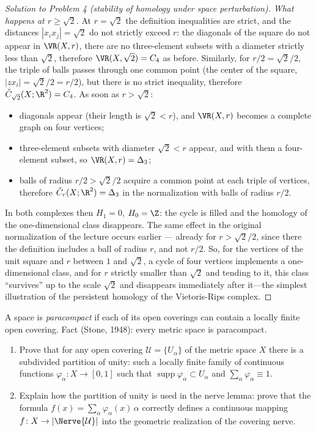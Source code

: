 \documentclass[a4paper,12pt]{report}
\begin{document}
\begin{proof}[Solution to Problem \textup{4} \textup{(}stability of homology under space perturbation\textup{)}]
\emph{What happens at $r\ge\sqrt2$.} At $r=\sqrt2$ the definition inequalities are strict, and the distances $|x_ix_j|=\sqrt2$ do not strictly exceed $r$: the diagonals of the square do not appear in $\VR(X,r)$, there are no three-element subsets with a diameter strictly less than $\sqrt2$, therefore $\VR(X,\sqrt2)=C_4$ as before. Similarly, for $r/2=\sqrt2/2$, the triple of balls passes through one common point \textup{(}the center of the square, $|zx_i|=\sqrt2/2=r/2$\textup{)}, but there is no strict inequality, therefore $\check C_{\sqrt2}(X;\R^2)=C_4$. As soon as $r>\sqrt2$:
\begin{itemize}[leftmargin=*]
\item diagonals appear \textup{(}their length is $\sqrt2<r$\textup{)}, and $\VR(X,r)$ becomes a complete graph on four vertices;
\item three-element subsets with diameter $\sqrt2<r$ appear, and with them a four-element subset, so $\VR(X,r)=\Delta_3$;
\item balls of radius $r/2>\sqrt2/2$ acquire a common point at each triple of vertices, therefore $\check C_r(X;\R^2)=\Delta_3$ in the normalization with balls of radius $r/2$.
\end{itemize}
In both complexes then $H_1=0$, $H_0=\Z$: the cycle is filled and the homology of the one-dimensional class disappears. The same effect in the original normalization of the lecture occurs earlier --- already for $r>\sqrt2/2$, since there the definition includes a ball of radius $r$, and not $r/2$. So, for the vertices of the unit square and $r$ between $1$ and $\sqrt2$, a cycle of four vertices implements a one-dimensional class, and for $r$ strictly smaller than $\sqrt2$ and tending to it, this class ``survives'' up to the scale $\sqrt2$ and disappears immediately after it---the simplest illustration of the persistent homology of the Vietoris-Rips complex.
\end{proof}
\begin{task}
A space is \emph{paracompact} if each of its open coverings can contain a locally finite open covering. Fact \textup{(}Stone, \textup{1948}\textup{)}\textup{:} every metric space is paracompact.
\begin{enumerate}[label=\textup{(\alph*)}]
\item Prove that for any open covering $\mathcal U = \{U_\alpha\}$ of the metric space $X$ there is a subdivided partition of unity\textup{:} such a locally finite family of continuous functions $\varphi_\alpha \colon X \to [0, 1]$ such that $\operatorname{supp} \varphi_\alpha \subset U_\alpha$ and $\sum_\alpha \varphi_\alpha \equiv 1$. 
\item Explain how the partition of unity is used in the nerve lemma\textup{:} prove that the formula $f(x) = \sum_\alpha \varphi_\alpha(x) \, \alpha$ correctly defines a continuous mapping $f \colon X \to |\Nerve{\mathcal U}|$ into the geometric realization of the covering nerve. 
\end{enumerate}
\end{task}
\end{document}
